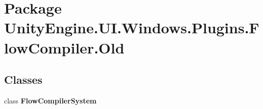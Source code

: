 \hypertarget{namespace_unity_engine_1_1_u_i_1_1_windows_1_1_plugins_1_1_flow_compiler_1_1_old}{}\section{Package Unity\+Engine.\+U\+I.\+Windows.\+Plugins.\+Flow\+Compiler.\+Old}
\label{namespace_unity_engine_1_1_u_i_1_1_windows_1_1_plugins_1_1_flow_compiler_1_1_old}
\subsection*{Classes}
\begin{DoxyCompactItemize}
\item 
class {\bfseries Flow\+Compiler\+System}
\end{DoxyCompactItemize}
